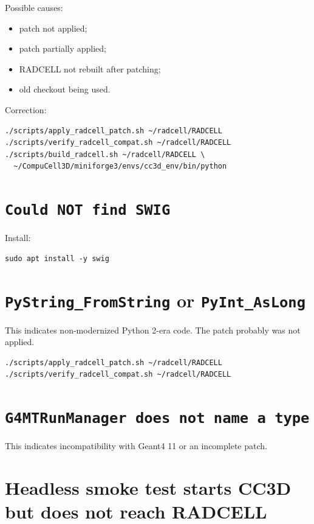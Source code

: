\documentclass[11pt,a4paper,twoside,pdftex]{refrep}
\begin{document}
Possible causes:

\begin{itemize}
  \item patch not applied;
  \item patch partially applied;
  \item RADCELL not rebuilt after patching;
  \item old checkout being used.
\end{itemize}

Correction:

\begin{lstlisting}
./scripts/apply_radcell_patch.sh ~/radcell/RADCELL
./scripts/verify_radcell_compat.sh ~/radcell/RADCELL
./scripts/build_radcell.sh ~/radcell/RADCELL \
  ~/CompuCell3D/miniforge3/envs/cc3d_env/bin/python
\end{lstlisting}

\section{\texttt{Could NOT find SWIG}}

Install:

\begin{lstlisting}
sudo apt install -y swig
\end{lstlisting}

\section{\texttt{PyString\_FromString} or \texttt{PyInt\_AsLong}}

This indicates non-modernized Python 2-era code. The patch probably was not applied.

\begin{lstlisting}
./scripts/apply_radcell_patch.sh ~/radcell/RADCELL
./scripts/verify_radcell_compat.sh ~/radcell/RADCELL
\end{lstlisting}

\section{\texttt{G4MTRunManager does not name a type}}

This indicates incompatibility with Geant4 11 or an incomplete patch.

\section{Headless smoke test starts CC3D but does not reach RADCELL}
\end{document}
